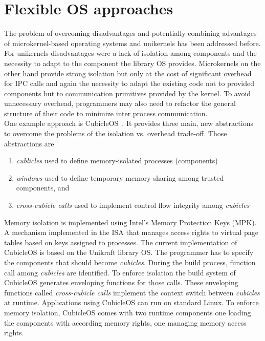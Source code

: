 \section{Flexible OS approaches}
\label{sec:FlexibleOSes}
The problem of overcoming disadvantages and potentially combining advantages of microkernel-based operating systems and unikernels has been addressed before. For unikernels disadvantages were a lack of isolation among components and the necessity to adapt to the component the library OS provides. Microkernels on the other hand provide strong isolation but only at the cost of significant overhead for IPC calls and again the necessity to adapt the existing code not to provided components but to communication primitives provided by the kernel. To avoid unnecessary overhead, programmers may also need to refactor the general structure of their code to minimize inter process communication. \\

One example approach is CubicleOS~\cite{sartakov2021cubicleos}. It provides three main, new abstractions to overcome the problems of the isolation vs. overhead trade-off. Those abstractions are 
\begin{enumerate}
    \item \emph{cublicles} used to define memory-isolated processes (components)
    \item \emph{windows} used to define temporary memory sharing among trusted components, and
    \item \emph{cross-cubicle calls} used to implement control flow integrity among \emph{cubicles}
\end{enumerate}
Memory isolation is implemented using Intel's Memory Protection Keys (MPK)\cite{intel64and}. A mechanism implemented in the ISA that manages access rights to virtual page tables based on keys assigned to processes. The current implementation of CubicleOS is based on the Unikraft library OS\cite{kuenzer2021unikraft}. The programmer has to specify the components that should become \emph{cubicles}. During the build process, function call among \emph{cubicles} are identified. To enforce isolation the build system of CubicleOS generates enveloping functions for those calls. These enveloping functions 
called \emph{cross-cubicle calls} implement the context switch between \emph{cubicles} at runtime. Applications using CubicleOS can run on standard Linux. To enforce memory isolation, CubicleOS comes with two runtime components one loading the components with according memory rights, one managing memory access rights. \\

